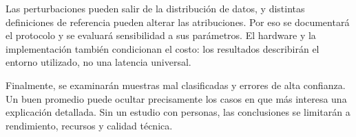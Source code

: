 Las perturbaciones pueden salir de la distribución de datos, y distintas definiciones de referencia pueden alterar las atribuciones. Por eso se documentará el protocolo y se evaluará sensibilidad a sus parámetros. El hardware y la implementación también condicionan el costo: los resultados describirán el entorno utilizado, no una latencia universal.

Finalmente, se examinarán muestras mal clasificadas y errores de alta confianza. Un buen promedio puede ocultar precisamente los casos en que más interesa una explicación detallada. Sin un estudio con personas, las conclusiones se limitarán a rendimiento, recursos y calidad técnica.

